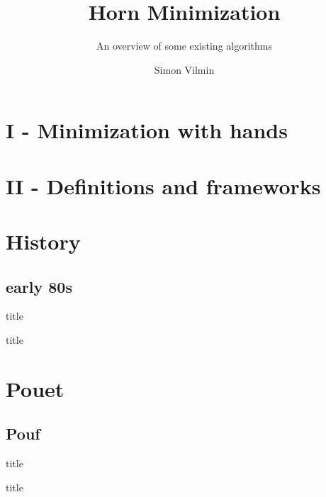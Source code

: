 \documentclass{beamer}
\begin{document}
	
\title{Horn Minimization}
\subtitle{An overview of some existing algorithms}
\author{Simon Vilmin}

{

\begin{frame}
\vspace{0.8em}
\maketitle

\end{frame}
}

\section{I - Minimization with hands}


\section{II - Definitions and frameworks}


\section{History}
\subsection{early 80s}
\begin{frame}{title}

\end{frame}

\begin{frame}{title}

\end{frame}

\section{Pouet}
\subsection{Pouf}
\begin{frame}{title}

\end{frame}

\begin{frame}{title}

\end{frame}
\end{document}
